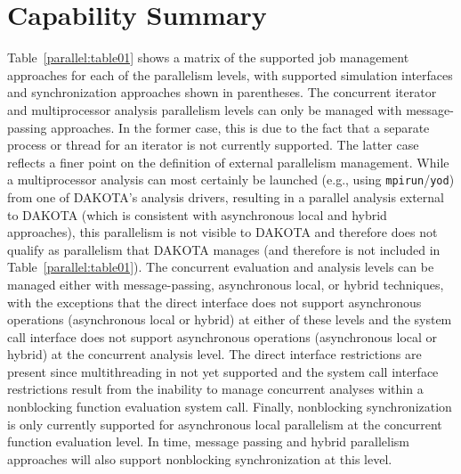 \section{Capability Summary}\label{parallel:summary}


Table~\ref{parallel:table01} shows a matrix of the supported job
management approaches for each of the parallelism levels, with
supported simulation interfaces and synchronization approaches shown
in parentheses. The concurrent iterator and multiprocessor analysis
parallelism levels can only be managed with message-passing
approaches. In the former case, this is due to the fact that a
separate process or thread for an iterator is not currently supported.
The latter case reflects a finer point on the definition of external
parallelism management. While a multiprocessor analysis can most
certainly be launched (e.g., using \texttt{mpirun}/\texttt{yod}) from
one of DAKOTA's analysis drivers, resulting in a parallel analysis
external to DAKOTA (which is consistent with asynchronous local and
hybrid approaches), this parallelism is not visible to DAKOTA and
therefore does not qualify as parallelism that DAKOTA manages (and
therefore is not included in Table~\ref{parallel:table01}). The
concurrent evaluation and analysis levels can be managed either with
message-passing, asynchronous local, or hybrid techniques, with the
exceptions that the direct interface does not support asynchronous
operations (asynchronous local or hybrid) at either of these levels
and the system call interface does not support asynchronous operations
(asynchronous local or hybrid) at the concurrent analysis level. The
direct interface restrictions are present since multithreading in not
yet supported and the system call interface restrictions result from
the inability to manage concurrent analyses within a nonblocking
function evaluation system call.  Finally, nonblocking synchronization
is only currently supported for asynchronous local parallelism at the
concurrent function evaluation level.  In time, message passing and
hybrid parallelism approaches will also support nonblocking
synchronization at this level.

